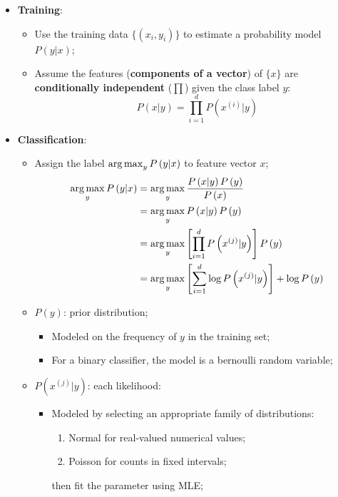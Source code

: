    \begin{itemize}
      \item \textbf{Training}:
      \begin{itemize}
        \item Use the training data $ \{ \left( x_{i}, y_{i} \right) \} $ to estimate a probability model $ P\left( y | x \right) $;
        \item Assume the features (\textbf{components of a vector}) of $ \{ x \} $ are \textbf{conditionally independent} ($ \prod $) given the class label $ y $:
        \begin{equation}
          P\left( x| y \right) = \prod_{i = 1}^{d} P\left( x^{(i)} | y \right)
        \end{equation}
      \end{itemize}
      
      \item \textbf{Classification}:
      \begin{itemize}
        \item Assign the label $ \operatorname*{arg\,max}_{y} P\left( y | x \right) $ to feature vector $ x $;
        \begin{align}
          \operatorname*{arg\,max}_{y} P\left( y | x \right) &= \operatorname*{arg\,max}_{y} \frac{ P\left( x | y \right) P\left( y \right) }{ P\left( x \right) } \\
          &= \operatorname*{arg\,max}_{y} P\left( x | y \right) P\left( y \right) \\
          &= \operatorname*{arg\,max}_{y} \left[ \prod_{i = 1}^{d} P\left( x^{(j)} | y \right) \right]  P\left( y \right) \\
          &= \operatorname*{arg\,max}_{y} \left[ \sum_{i = 1}^{d} \log P\left( x^{(j)} | y \right) \right] + \log P\left( y \right)
        \end{align}
        
        \item $ P\left( y \right) $: prior distribution;
        \begin{itemize}
          \item Modeled on the frequency of $ y $ in the training set;
          \item For a binary classifier, the model is a bernoulli random variable;
        \end{itemize}
        
        \item $ P\left( x^{(j)} | y \right) $: each likelihood:
        \begin{itemize}
          \item Modeled by selecting an appropriate family of distributions:
          \begin{enumerate}
            \item Normal for real-valued numerical values;
            \item Poisson for counts in fixed intervals;
          \end{enumerate}
          then fit the parameter using MLE;
        \end{itemize}
      \end{itemize}
    \end{itemize}
    
